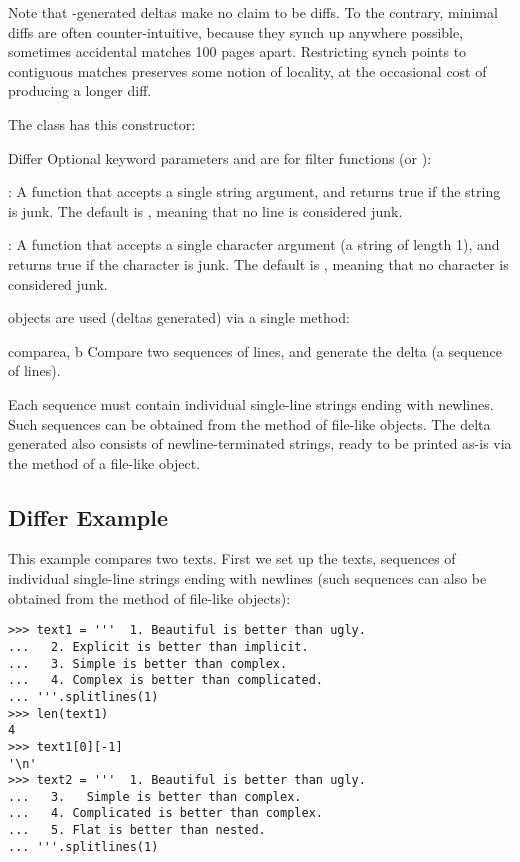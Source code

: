 Note that -generated deltas make no claim to be
 diffs. To the contrary, minimal diffs are often
counter-intuitive, because they synch up anywhere possible, sometimes
accidental matches 100 pages apart. Restricting synch points to
contiguous matches preserves some notion of locality, at the
occasional cost of producing a longer diff.

The  class has this constructor:

\begin{classdesc}{Differ}{}
  Optional keyword parameters  and  are
  for filter functions (or ):

  : A function that accepts a single string
  argument, and returns true if the string is junk.  The default is
  , meaning that no line is considered junk.

  : A function that accepts a single character argument
  (a string of length 1), and returns true if the character is junk.
  The default is , meaning that no character is
  considered junk.
\end{classdesc}

 objects are used (deltas generated) via a single
method:

\begin{methoddesc}{compare}{a, b}
  Compare two sequences of lines, and generate the delta (a sequence
  of lines).

  Each sequence must contain individual single-line strings ending
  with newlines. Such sequences can be obtained from the
   method of file-like objects.  The delta generated
  also consists of newline-terminated strings, ready to be printed as-is
  via the  method of a file-like object.
\end{methoddesc}


\subsection{Differ Example \label{differ-examples}}

This example compares two texts. First we set up the texts, sequences
of individual single-line strings ending with newlines (such sequences
can also be obtained from the  method of file-like
objects):

\begin{verbatim}
>>> text1 = '''  1. Beautiful is better than ugly.
...   2. Explicit is better than implicit.
...   3. Simple is better than complex.
...   4. Complex is better than complicated.
... '''.splitlines(1)
>>> len(text1)
4
>>> text1[0][-1]
'\n'
>>> text2 = '''  1. Beautiful is better than ugly.
...   3.   Simple is better than complex.
...   4. Complicated is better than complex.
...   5. Flat is better than nested.
... '''.splitlines(1)
\end{verbatim}

